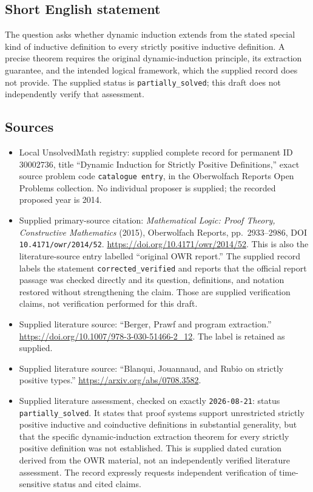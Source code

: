 \documentclass[11pt]{article}
\begin{document}
\subsection{Short English statement}
The question asks whether dynamic induction extends from the stated special kind of inductive definition to every strictly positive inductive definition. A precise theorem requires the original dynamic-induction principle, its extraction guarantee, and the intended logical framework, which the supplied record does not provide. The supplied status is \texttt{partially\_solved}; this draft does not independently verify that assessment.
\subsection{Sources}
\begin{itemize}
\item Local UnsolvedMath registry: supplied complete record for permanent ID \(30002736\), title ``Dynamic Induction for Strictly Positive Definitions,'' exact source problem code \texttt{catalogue entry}, in the Oberwolfach Reports Open Problems collection. No individual proposer is supplied; the recorded proposed year is 2014.
\item Supplied primary-source citation: \emph{Mathematical Logic: Proof Theory, Constructive Mathematics} (2015), Oberwolfach Reports, pp.~2933--2986, DOI \texttt{10.4171/owr/2014/52}. \url{https://doi.org/10.4171/owr/2014/52}. This is also the literature-source entry labelled ``original OWR report.'' The supplied record labels the statement \texttt{corrected\_verified} and reports that the official report passage was checked directly and its question, definitions, and notation restored without strengthening the claim. Those are supplied verification claims, not verification performed for this draft.
\item Supplied literature source: ``Berger, Prawf and program extraction.'' \url{https://doi.org/10.1007/978-3-030-51466-2_12}. The label is retained as supplied.
\item Supplied literature source: ``Blanqui, Jouannaud, and Rubio on strictly positive types.'' \url{https://arxiv.org/abs/0708.3582}.
\item Supplied literature assessment, checked on exactly \texttt{2026-08-21}: status \texttt{partially\_solved}. It states that proof systems support unrestricted strictly positive inductive and coinductive definitions in substantial generality, but that the specific dynamic-induction extraction theorem for every strictly positive definition was not established. This is supplied dated curation derived from the OWR material, not an independently verified literature assessment. The record expressly requests independent verification of time-sensitive status and cited claims.
\end{itemize}
\end{document}
